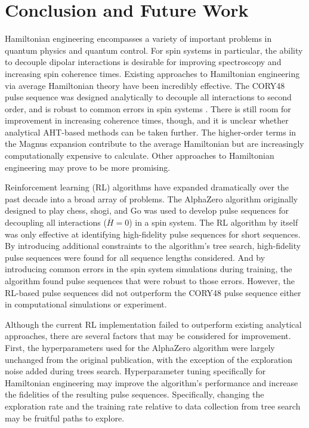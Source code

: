\chapter{Conclusion and Future Work}

Hamiltonian engineering encompasses a variety of important problems in quantum physics and quantum control. For spin systems in particular, the ability to decouple dipolar interactions is desirable for improving spectroscopy and increasing spin coherence times.
Existing approaches to Hamiltonian engineering via average Hamiltonian theory have been incredibly effective. The CORY48 pulse sequence was designed analytically to decouple all interactions to second order, and is robust to common errors in spin systems \cite{CORY1990205}. There is still room for improvement in increasing coherence times, though, and it is unclear whether analytical AHT-based methods can be taken further. The higher-order terms in the Magnus expansion contribute to the average Hamiltonian but are increasingly computationally expensive to calculate. Other approaches to Hamiltonian engineering may prove to be more promising.

Reinforcement learning (RL) algorithms have expanded dramatically over the past decade into a broad array of problems. The AlphaZero algorithm originally designed to play chess, shogi, and Go was used to develop pulse sequences for decoupling all interactions ($\overline{H} = 0$) in a spin system. The RL algorithm by itself was only effective at identifying high-fidelity pulse sequences for short sequences. By introducing additional constraints to the algorithm's tree search, high-fidelity pulse sequences were found for all sequence lengths considered. And by introducing common errors in the spin system simulations during training, the algorithm found pulse sequences that were robust to those errors. However, the RL-based pulse sequences did not outperform the CORY48 pulse sequence either in computational simulations or experiment.


Although the current RL implementation failed to outperform existing analytical approaches, there are several factors that may be considered for improvement.
First, the hyperparameters used for the AlphaZero algorithm were largely unchanged from the original publication, with the exception of the exploration noise added during trees search. Hyperparameter tuning specifically for Hamiltonian engineering may improve the algorithm's performance and increase the fidelities of the resulting pulse sequences. Specifically, changing the exploration rate and the training rate relative to data collection from tree search may be fruitful paths to explore.

